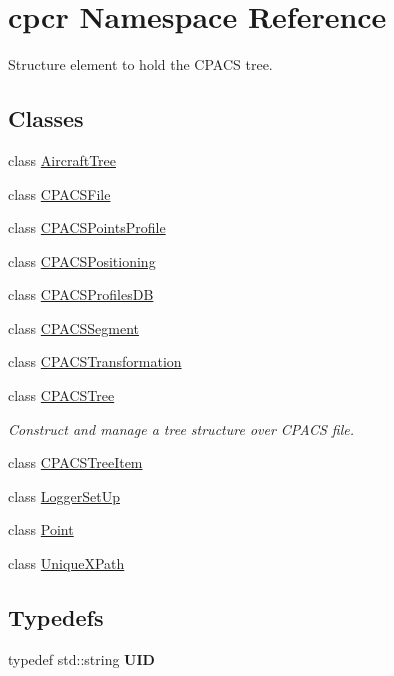 \hypertarget{namespacecpcr}{\section{cpcr Namespace Reference}
\label{namespacecpcr}
}


Structure element to hold the C\-P\-A\-C\-S tree.  


\subsection*{Classes}
\begin{DoxyCompactItemize}
\item 
class \hyperlink{classcpcr_1_1AircraftTree}{Aircraft\-Tree}
\item 
class \hyperlink{classcpcr_1_1CPACSFile}{C\-P\-A\-C\-S\-File}
\item 
class \hyperlink{classcpcr_1_1CPACSPointsProfile}{C\-P\-A\-C\-S\-Points\-Profile}
\item 
class \hyperlink{classcpcr_1_1CPACSPositioning}{C\-P\-A\-C\-S\-Positioning}
\item 
class \hyperlink{classcpcr_1_1CPACSProfilesDB}{C\-P\-A\-C\-S\-Profiles\-D\-B}
\item 
class \hyperlink{classcpcr_1_1CPACSSegment}{C\-P\-A\-C\-S\-Segment}
\item 
class \hyperlink{classcpcr_1_1CPACSTransformation}{C\-P\-A\-C\-S\-Transformation}
\item 
class \hyperlink{classcpcr_1_1CPACSTree}{C\-P\-A\-C\-S\-Tree}
\begin{DoxyCompactList}\small\item\em Construct and manage a tree structure over C\-P\-A\-C\-S file. \end{DoxyCompactList}\item 
class \hyperlink{classcpcr_1_1CPACSTreeItem}{C\-P\-A\-C\-S\-Tree\-Item}
\item 
class \hyperlink{classcpcr_1_1LoggerSetUp}{Logger\-Set\-Up}
\item 
class \hyperlink{classcpcr_1_1Point}{Point}
\item 
class \hyperlink{classcpcr_1_1UniqueXPath}{Unique\-X\-Path}
\end{DoxyCompactItemize}
\subsection*{Typedefs}
\begin{DoxyCompactItemize}
\item 
\hypertarget{namespacecpcr_a6451b9f6ef3ea260f4ab48acd86d5746}{typedef std\-::string {\bfseries U\-I\-D}}\label{namespacecpcr_a6451b9f6ef3ea260f4ab48acd86d5746}

\end{DoxyCompactItemize}

